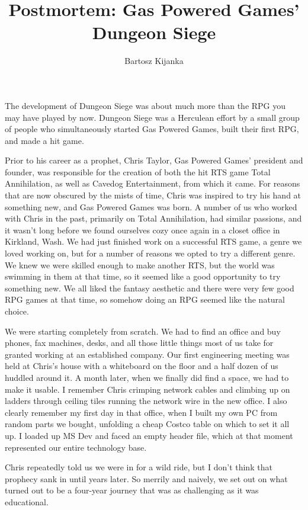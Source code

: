 \documentclass[a4paper,10pt]{article}
\title{Postmortem: Gas Powered Games' Dungeon Siege}
\author{Bartosz Kijanka}
\begin{document}
\maketitle

\begin{abstract}

\end{abstract}

 The development of Dungeon Siege was about much more than the RPG you may have played by now. Dungeon Siege was a Herculean effort by a small group of people who simultaneously started Gas Powered Games, built their first RPG, and made a hit game.

Prior to his career as a prophet, Chris Taylor, Gas Powered Games' president and founder, was responsible for the creation of both the hit RTS game Total Annihilation, as well as Cavedog Entertainment, from which it came. For reasons that are now obscured by the mists of time, Chris was inspired to try his hand at something new, and Gas Powered Games was born. A number of us who worked with Chris in the past, primarily on Total Annihilation, had similar passions, and it wasn't long before we found ourselves cozy once again in a closet office in Kirkland, Wash. We had just finished work on a successful RTS game, a genre we loved working on, but for a number of reasons we opted to try a different genre. We knew we were skilled enough to make another RTS, but the world was swimming in them at that time, so it seemed like a good opportunity to try something new. We all liked the fantasy aesthetic and there were very few good RPG games at that time, so somehow doing an RPG seemed like the natural choice.

We were starting completely from scratch. We had to find an office and buy phones, fax machines, desks, and all those little things most of us take for granted working at an established company. Our first engineering meeting was held at Chris's house with a whiteboard on the floor and a half dozen of us huddled around it. A month later, when we finally did find a space, we had to make it usable. I remember Chris crimping network cables and climbing up on ladders through ceiling tiles running the network wire in the new office. I also clearly remember my first day in that office, when I built my own PC from random parts we bought, unfolding a cheap Costco table on which to set it all up. I loaded up MS Dev and faced an empty header file, which at that moment represented our entire technology base.

Chris repeatedly told us we were in for a wild ride, but I don't think that prophecy sank in until years later. So merrily and naively, we set out on what turned out to be a four-year journey that was as challenging as it was educational.
\end{document}
